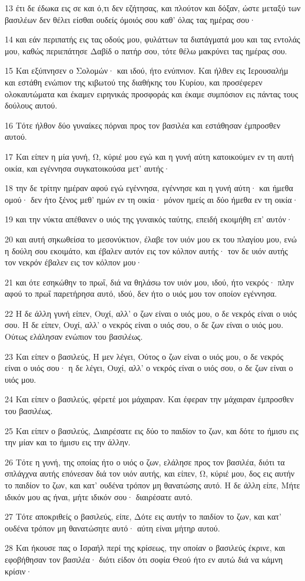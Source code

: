 \par 13 έτι δε έδωκα εις σε και ό,τι δεν εζήτησας, και πλούτον και δόξαν, ώστε μεταξύ των βασιλέων δεν θέλει είσθαι ουδείς όμοιός σου καθ' όλας τας ημέρας σου·
\par 14 και εάν περιπατής εις τας οδούς μου, φυλάττων τα διατάγματά μου και τας εντολάς μου, καθώς περιεπάτησε Δαβίδ ο πατήρ σου, τότε θέλω μακρύνει τας ημέρας σου.
\par 15 Και εξύπνησεν ο Σολομών· και ιδού, ήτο ενύπνιον. Και ήλθεν εις Ιερουσαλήμ και εστάθη ενώπιον της κιβωτού της διαθήκης του Κυρίου, και προσέφερεν ολοκαυτώματα και έκαμεν ειρηνικάς προσφοράς και έκαμε συμπόσιον εις πάντας τους δούλους αυτού.
\par 16 Τότε ήλθον δύο γυναίκες πόρναι προς τον βασιλέα και εστάθησαν έμπροσθεν αυτού.
\par 17 Και είπεν η μία γυνή, Ω, κύριέ μου εγώ και η γυνή αύτη κατοικούμεν εν τη αυτή οικία, και εγέννησα συγκατοικούσα μετ' αυτής·
\par 18 την δε τρίτην ημέραν αφού εγώ εγέννησα, εγέννησε και η γυνή αύτη· και ήμεθα ομού· δεν ήτο ξένος μεθ' ημών εν τη οικία· μόνον ημείς αι δύο ήμεθα εν τη οικία·
\par 19 και την νύκτα απέθανεν ο υιός της γυναικός ταύτης, επειδή εκοιμήθη επ' αυτόν·
\par 20 και αυτή σηκωθείσα το μεσονύκτιον, έλαβε τον υιόν μου εκ του πλαγίου μου, ενώ η δούλη σου εκοιμάτο, και έβαλεν αυτόν εις τον κόλπον αυτής· τον δε υιόν αυτής τον νεκρόν έβαλεν εις τον κόλπον μου·
\par 21 και ότε εσηκώθην το πρωΐ, διά να θηλάσω τον υιόν μου, ιδού, ήτο νεκρός· πλην αφού το πρωΐ παρετήρησα αυτό, ιδού, δεν ήτο ο υιός μου τον οποίον εγέννησα.
\par 22 Η δε άλλη γυνή είπεν, Ουχί, αλλ' ο ζων είναι ο υιός μου, ο δε νεκρός είναι ο υιός σου. Η δε είπεν, Ουχί, αλλ' ο νεκρός είναι ο υιός σου, ο δε ζων είναι ο υιός μου. Ούτως ελάλησαν ενώπιον του βασιλέως.
\par 23 Και είπεν ο βασιλεύς, Η μεν λέγει, Ούτος ο ζων είναι ο υιός μου, ο δε νεκρός είναι ο υιός σου· η δε λέγει, Ουχί, αλλ' ο νεκρός είναι ο υιός σου, ο δε ζων είναι ο υιός μου.
\par 24 Και είπεν ο βασιλεύς, φέρετέ μοι μάχαιραν. Και έφεραν την μάχαιραν έμπροσθεν του βασιλέως.
\par 25 Και είπεν ο βασιλεύς, Διαιρέσατε εις δύο το παιδίον το ζων, και δότε το ήμισυ εις την μίαν και το ήμισυ εις την άλλην.
\par 26 Τότε η γυνή, της οποίας ήτο ο υιός ο ζων, ελάλησε προς τον βασιλέα, διότι τα σπλάγχνα αυτής επόνεσαν διά τον υιόν αυτής, και είπεν, Ω, κύριέ μου, δος εις αυτήν το παιδίον το ζων, και κατ' ουδένα τρόπον μη θανατώσης αυτό. Η δε άλλη είπε, Μήτε ιδικόν μου ας ήναι, μήτε ιδικόν σου· διαιρέσατε αυτό.
\par 27 Τότε αποκριθείς ο βασιλεύς, είπε, Δότε εις αυτήν το παιδίον το ζων, και κατ' ουδένα τρόπον μη θανατώσητε αυτό· αύτη είναι μήτηρ αυτού.
\par 28 Και ήκουσε πας ο Ισραήλ περί της κρίσεως, την οποίαν ο βασιλεύς έκρινε, και εφοβήθησαν τον βασιλέα· διότι είδον ότι σοφία Θεού ήτο εν αυτώ διά να κάμνη κρίσιν·

